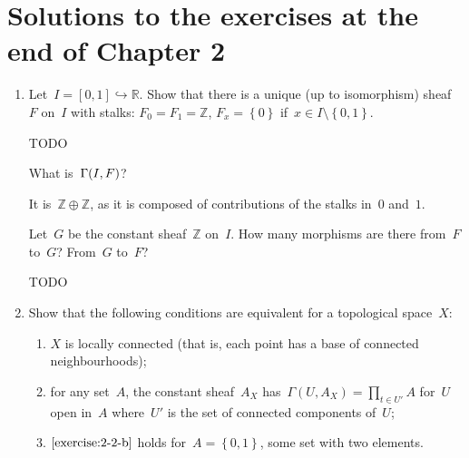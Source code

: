 \documentclass[a4paper,11pt,oneside,openany,article]{memoir}
\begin{document}
\clearpage

\chapter{Solutions to the exercises at the end of Chapter 2}
\begin{enumerate}
  \item Let~$I=[0,1]\hookrightarrow\mathbb{R}$. Show that there is a unique (up to isomorphism) sheaf~$F$ on~$I$ with stalks: $F_0=F_1=\mathbb{Z}$, $F_x=\left\{ 0 \right\}$ if~$x\in I\setminus\left\{ 0,1 \right\}$.

    \begin{solution}
      TODO
    \end{solution}

    What is~$\mathrm{\Gamma}(I, F)$?

    \begin{solution}
      It is~$\mathbb{Z}\oplus\mathbb{Z}$, as it is composed of contributions of the stalks in~$0$ and~$1$.
    \end{solution}

    Let~$G$ be the constant sheaf~$\mathbb{Z}$ on~$I$. How many morphisms are there from~$F$ to~$G$? From~$G$ to~$F$?

    \begin{solution}
      TODO
    \end{solution}

  \item Show that the following conditions are equivalent for a topological space~$X$:
    \begin{enumerate}
      \item\label{exercise:2-2-a} $X$ is locally connected (that is, each point has a base of connected neighbourhoods);
      \item\label{exercise:2-2-b} for any set~$A$, the constant sheaf~$A_X$ has~$\Gamma(U,A_X)=\prod_{t\in U'}A$ for~$U$ open in~$A$ where~$U'$ is the set of connected components of~$U$;
      \item\label{exercise:2-2-c} $\ref{exercise:2-2-b}$ holds for~$A=\left\{ 0,1 \right\}$, some set with two elements.
    \end{enumerate}


\end{enumerate}
\end{document}
